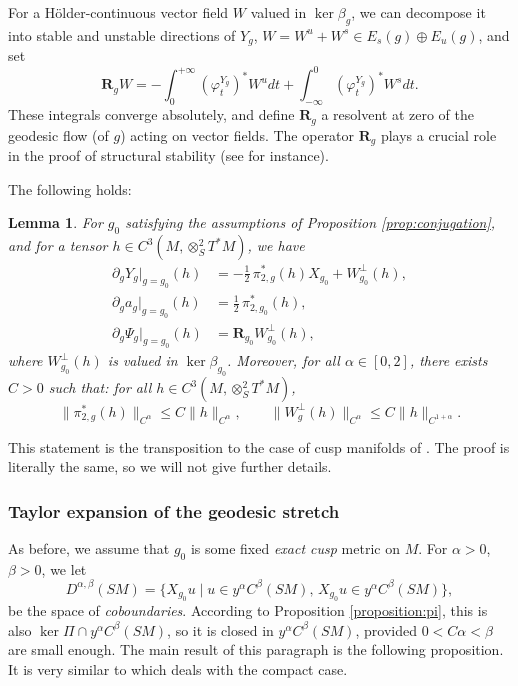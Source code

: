 \documentclass[10pt]{amsart}
\theoremstyle{plain}
\newtheorem{lemma}{Lemma}[section]
\theoremstyle{definition}
\begin{document}
For a Hölder-continuous vector field $W$ valued in $\ker\beta_{g}$, we can decompose it into stable and unstable directions of $Y_g$, $W = W^u + W^s \in E_s(g) \oplus E_u(g)$, and set
\[
\mathbf{R}_{g} W = - \int_0^{+\infty} (\varphi_t^{Y_g})^\ast W^u dt + \int_{-\infty}^0 (\varphi_t^{Y_g})^\ast W^s dt.
\]
These integrals converge absolutely, and define $\mathbf{R}_{g}$ a resolvent at zero of the geodesic flow (of $g$) acting on vector fields. {\color{black}The operator $\mathbf{R}_g$ plays a crucial role in the proof of structural stability (see \cite[Lem.\,5.4]{Bonthonneau-Lefeuvre-21} for instance).}

The following holds:

\begin{lemma}
For $g_0$ satisfying the assumptions of Proposition \ref{prop:conjugation}, and for a tensor $h \in C^3(M,\otimes^2_S T^*M)$, we have
\begin{align}
\partial_g Y_{g}|_{g=g_0}(h) & = - \frac{1}{2}\,\pi_{2,g}^\ast (h) X_{g_0} + W_{g_0}^\perp (h), \\
\partial_g a_{g}|_{g=g_0}(h) & = \frac{1}{2}\,\pi_{2,g_0}^\ast (h), \label{equation:ag} \\
\partial_g \Psi_{g}|_{g=g_0}(h) & = \mathbf{R}_{g_0} W_{g_0}^\perp(h),
\end{align}
where $W_{g_0}^\perp(h)$ is valued in $\ker\beta_{g_0}$. Moreover, for all $\alpha \in [0,2]$, there exists $C > 0$ such that: for all $h \in C^3(M,\otimes^2_S T^*M)$,
\begin{equation}
\label{equation:est}
\| \pi_{2,g}^\ast(h) \|_{C^\alpha} \leq C \|h\|_{C^\alpha}, \qquad \| W_g^\perp(h)\|_{C^\alpha} \leq C \|h\|_{C^{1+\alpha}}.
\end{equation}
\end{lemma}

This statement is the transposition to the case of cusp manifolds of \cite[Lem.\,5.4, 5.5 \& 5.6]{Bonthonneau-Lefeuvre-21}. The proof is literally the same, so we will not give further details.

\subsubsection{Taylor expansion of the geodesic stretch}

As before, we assume that $g_0$ is some fixed \emph{exact cusp} metric on $M$. For $\alpha >0$, $\beta>0$, we let
\[
D^{\alpha,\beta}(SM) = \{ X_{g_0} u\mid u\in y^\alpha C^\beta(SM),\, X_{g_0} u \in y^\alpha C^\beta(SM) \},
\]
be the space of \emph{coboundaries}. According to Proposition \ref{proposition:pi}, this is also $\ker \Pi\cap y^\alpha C^\beta(SM)$, so it is closed in $y^\alpha C^\beta(SM)$, provided $0<C\alpha< \beta$ are small enough. The main result of this paragraph is the following proposition. It is very similar to \cite[Prop.\,5.3]{Bonthonneau-Lefeuvre-21} which deals with the compact case.
\end{document}

